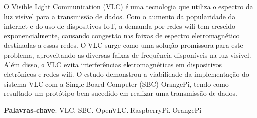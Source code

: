 \documentclass[article,
12pt,
a4paper,
openany,
oneside,
brazil,
]{abntex2}
\begin{document}
  \maketitle

  \begin{resumo}
    O Visible Light Communication (VLC) é uma tecnologia que utiliza o espectro da luz visível para a transmissão de dados. Com o aumento da popularidade da internet e do uso de dispositivos IoT, a demanda por redes wifi tem crescido exponencialmente, causando congestão nas faixas de espectro eletromagnético destinadas a essas redes. O VLC surge como uma solução promissora para este problema, aproveitando as diversas faixas de frequência disponíveis na luz visível. Além disso, o VLC evita interferências eletromagnéticas em dispositivos eletrônicos e redes wifi. O estudo demonstrou a viabilidade da implementação do sistema VLC com a Single Board Computer (SBC) OrangePi, tendo como resultado um protótipo bem sucedido em realizar uma transmissão de dados.
\vspace{\onelineskip}
 
    \noindent
    \textbf{Palavras-chave}: VLC. SBC. OpenVLC. RaspberryPi. OrangePi
  \end{resumo}


  \textual

  
  
  
  
  
  
  
  
  

  
\end{document}
